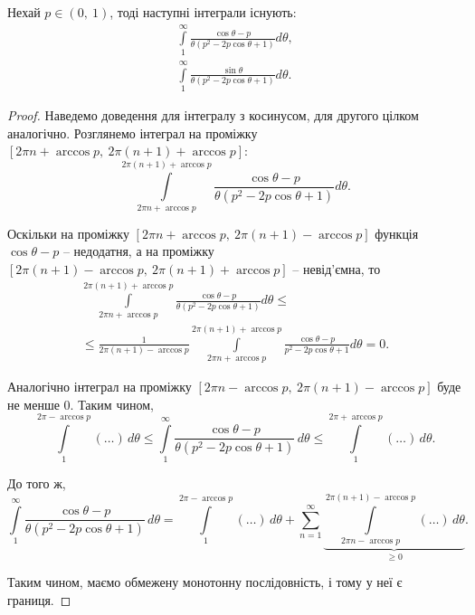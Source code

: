 \begin{corollary}
\label{lem:trig_bound}
Нехай $p \in (0,~1)$, тоді наступні інтеграли існують:
\begin{gather*}
	\int\limits_{1}^{\infty} \frac{\cos \theta - p}{\theta(p^2 - 2p\cos\theta + 1)} d \theta, \\
	\int\limits_{1}^{\infty} \frac{\sin \theta}{\theta(p^2 - 2p\cos\theta + 1)} d \theta.
\end{gather*}
\begin{proof}
	Наведемо доведення для інтегралу з косинусом, для другого цілком аналогічно. Розглянемо інтеграл на проміжку $[2\pi n + \arccos p,~2\pi (n + 1) + \arccos p]$:
	\begin{equation*}
		\int\limits_{2\pi n + \arccos p}^{2\pi (n + 1) + \arccos p} \frac{\cos \theta - p}{\theta(p^2 - 2p\cos\theta + 1)} d \theta.
	\end{equation*}
	
	Оскільки на проміжку $[2\pi n + \arccos p,~2\pi (n + 1) - \arccos p]$ функція $\cos\theta - p$ -- недодатня, а на проміжку $[2\pi (n + 1) - \arccos p,~2\pi (n + 1) + \arccos p]$ -- невід'ємна, то 
	\begin{gather*}
	\int\limits_{2\pi n + \arccos p}^{2\pi (n + 1) + \arccos p} \frac{\cos \theta - p}{\theta(p^2 - 2p\cos\theta + 1)} d \theta \leq \\
	\leq \frac{1}{2\pi (n + 1) - \arccos p} \int\limits_{2\pi n + \arccos p}^{2\pi (n + 1) + \arccos p} \frac{\cos \theta - p}{p^2 - 2p\cos\theta + 1} d \theta = 0.
	\end{gather*}
	
	Аналогічно інтеграл на проміжку $[2\pi n - \arccos p,~2\pi (n + 1) - \arccos p]$ буде не менше 0. Таким чином,
	\begin{equation*}
	\int\limits_{1}^{2\pi - \arccos p} (\dots) \,d\theta \leq \int\limits_{1}^{\infty} \frac{\cos \theta - p}{\theta(p^2 - 2p\cos\theta + 1)} \, d\theta \leq \int\limits_{1}^{2\pi + \arccos p} (\dots) \,d\theta.
	\end{equation*}
	
	До того ж,
	\begin{equation*}
	\int\limits_{1}^{\infty} \frac{\cos \theta - p}{\theta(p^2 - 2p\cos\theta + 1)} \, d\theta = \int\limits_{1}^{2\pi - \arccos p} (\dots) \,d\theta + \sum\limits_{n = 1}^{\infty} \underbrace{\int\limits_{2\pi n - \arccos p}^{2\pi (n + 1) - \arccos p} (\dots) \,d\theta}_{\geq 0}.
	\end{equation*}
	
	Таким чином, маємо обмежену монотонну послідовність, і тому у неї є границя.
\end{proof}
\end{corollary}

